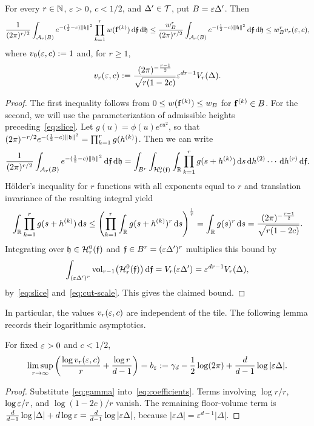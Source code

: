 \documentclass[11pt,letterpaper]{article}
\begin{document}
\begin{lemma}\label{lem:tile-height}
      For every $r\in\mathbb N$, $\varepsilon>0$, $c<1/2$, and $\Delta'\in\mathcal T$, put $B=\varepsilon\Delta'$. Then
      \begin{equation}\label{eq:tile-weight-bound}
            \frac1{(2\pi)^{r/2}}\int_{\mathcal A_r(B)}e^{-(\frac12-c)\|\mathfrak h\|^2}
            \prod_{k=1}^rw(\mathbf f^{(k)})\,\mathrm d\bm{\mathfrak f}\,\mathrm d\mathfrak h
            \le\frac{w_B^r}{(2\pi)^{r/2}}
            \int_{\mathcal A_r(B)}e^{-(\frac12-c)\|\mathfrak h\|^2}\,\mathrm d\bm{\mathfrak f}\,\mathrm d\mathfrak h
            \le w_B^rv_r(\varepsilon,c),
      \end{equation}
      where $v_0(\varepsilon,c):=1$ and, for $r\ge1$,
      \begin{equation}\label{eq:coefficients}
            v_r(\varepsilon,c):=\frac{(2\pi)^{-\frac{r-1}{2}}}{\sqrt{r(1-2c)}}\varepsilon^{dr-1} V_r(\Delta).
      \end{equation}
\end{lemma}
\begin{proof}
      The first inequality follows from $0\leq w(\mathbf f^{(k)})\leq w_B$ for $\mathbf f^{(k)}\in B$. For the second, we will use the parameterization of admissible heights preceding~\eqref{eq:slice}.
      Let $g(u)=\phi(u)e^{cu^2}$, so that
      $(2\pi)^{-r/2}e^{-(\frac12-c)\|\mathfrak h\|^2}
            =\prod_{k=1}^r g(h^{(k)})$. Then we can write
      \[\frac{1}{(2\pi)^{r/2}}
            \int_{\mathcal A_r(B)}e^{-(\frac12-c)\|\mathfrak h\|^2}\,\mathrm d\bm{\mathfrak f}\,\mathrm d\mathfrak h=
            \int_{B^{r}}\int_{\mathcal H_r^0(\bm{\mathfrak f})}\int_{\mathbb R}\prod_{k=1}^r g(s+h^{(k)})\,\mathrm d s\,\mathrm d h^{(2)}\cdots \,\mathrm d h^{(r)}\,\mathrm d\bm{\mathfrak f}.\]
      H\"older's inequality for $r$ functions with all exponents equal to $r$ and translation invariance of the resulting integral yield
      \[
            \int_\mathbb R\prod_{k=1}^r g(s+h^{(k)})\,\mathrm d s
            \le \left(\prod_{k=1}^r\int_\mathbb R g(s+h^{(k)})^r\,\mathrm d s\right)^{\frac{1}{r}}
            = \int_\mathbb R g(s)^r\,\mathrm d s
            =\frac{(2\pi)^{-\frac{r-1}{2}}}
            {\sqrt{r(1-2c)}}.
      \]
      Integrating over $\mathfrak h\in\mathcal H_r^0(\bm{\mathfrak f})$ and $\bm{\mathfrak f}\in B^{r}=(\varepsilon\Delta')^r$ multiplies this bound by
      \[
            \int_{(\varepsilon\Delta')^r} \operatorname{vol}_{r-1}\bigl(\mathcal H_r^0(\bm{\mathfrak f})\bigr)\,\mathrm d\bm{\mathfrak f}
            =V_r(\varepsilon\Delta')=\varepsilon^{dr-1}V_r(\Delta),
      \]
      by~\eqref{eq:slice} and~\eqref{eq:cut-scale}. This gives the claimed bound.
\end{proof}

In particular, the values $v_r(\varepsilon,c)$ are independent of the tile. The following lemma records their logarithmic asymptotics.
\begin{lemma}
      For fixed $\varepsilon>0$ and $c<1/2$,
      \begin{equation}\label{eq:coefficient-rate}
            \limsup_{r\to\infty}\left(\frac{\log v_r(\varepsilon,c)}{r}+\frac{\log r}{d-1}\right) =b_\varepsilon:=\gamma_d-\frac12\log(2\pi)+\frac d{d-1}\log|\varepsilon\Delta|.
      \end{equation}
\end{lemma}
\begin{proof}
      Substitute~\eqref{eq:gamma} into~\eqref{eq:coefficients}. Terms involving $\log r/r$, $\log\varepsilon/r$, and $\log(1-2c)/r$ vanish. The remaining floor-volume term is $\frac d{d-1}\log|\Delta|+d\log\varepsilon=\frac d{d-1}\log|\varepsilon\Delta|$, because $|\varepsilon\Delta|=\varepsilon^{d-1}|\Delta|$.
\end{proof}
\end{document}
